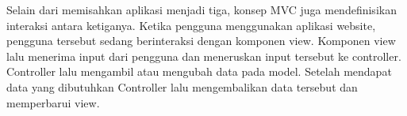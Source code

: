 	Selain dari memisahkan aplikasi menjadi tiga, konsep MVC juga mendefinisikan interaksi antara ketiganya. Ketika pengguna menggunakan aplikasi website, pengguna tersebut sedang berinteraksi dengan komponen view. Komponen view lalu menerima input dari pengguna dan meneruskan input tersebut ke controller. Controller lalu mengambil atau mengubah data pada model. Setelah mendapat data yang dibutuhkan Controller lalu mengembalikan data tersebut dan memperbarui view.

